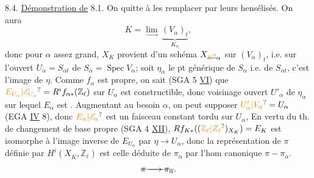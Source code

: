 8.4. \uline{Démonstration de} 8.1. On   quitte à les remplacer par leurs hensélisés. On aura
\[
 K=\underset{\longrightarrow}{\lim}\,\underbrace{(V_\alpha)_t}_{K_\alpha},
\]
donc pour $\alpha$ assez grand, $X_K$ provient d'un schéma  $X_{\deleted{\unsure{K}}\alpha}$ sur  $(V_\alpha)_t$, i.e. sur l'ouvert $U_\alpha=S_{\alpha t}$ de $S_\alpha=\operatorname{Spec}V_\alpha$;  soit $\eta_\alpha$ le pt générique de $S_\alpha$ i.e. de $S_{\alpha t}$, c'est l'image de $\eta$.
Comme $f_\alpha$ est propre, on sait (SGA 5 \uline{VI}) que $\unsure{E_{U_\alpha}|\mathscr E_{U_\alpha}}=R^if_{\alpha *}(\mathbb Z_\ell)$ sur $U_\alpha$ est constructible, donc  voisinage ouvert $U'_\alpha$ de $\eta_\alpha$ sur lequel $E_\alpha$ est . Augmentant au besoin $\alpha$,  on
peut supposer $\unsure{U'_\alpha|V_\alpha}=U_\alpha$ (EGA \uline{IV} 8), donc $\unsure{E_\alpha|\mathscr E_\alpha}$ est un faisceau constant tordu sur $U_\alpha$,  En vertu du th. de changement de base propre (SGA 4 \uline{XII}), $Rf_{K*}((\unsure{\mathbb Z_\ell|Z_\ell})_{X_K})=E_K$ est  isomorphe à l'image inverse de $E_{U_\alpha}$ par  $\eta\longrightarrow U_\alpha$, donc la représentation de $\pi$  définie par $H^i(X_{\overline K},\mathbb Z_\ell)$ est celle déduite de $\pi_\alpha$ par l'hom canonique $\pi-\pi_\alpha$.
\[
\deleted{\pi\longrightarrow\pi_\alpha}.
\]

